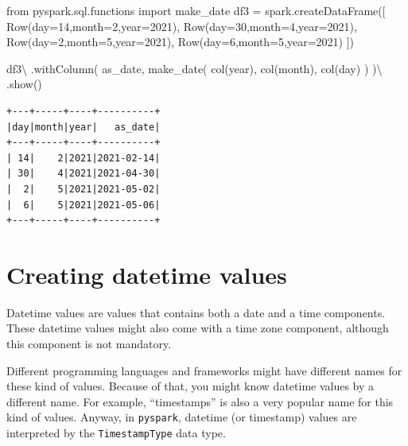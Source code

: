 \documentclass[
  11pt,
  letterpaper,
  DIV=11,
  numbers=noendperiod]{scrreprt}
\newenvironment{Shaded}{\begin{snugshade}}{\end{snugshade}}
\newcommand{\DecValTok}[1]{\textcolor[rgb]{0.68,0.00,0.00}{#1}}
\newcommand{\ImportTok}[1]{\textcolor[rgb]{0.00,0.46,0.62}{#1}}
\newcommand{\NormalTok}[1]{\textcolor[rgb]{0.00,0.23,0.31}{#1}}
\newcommand{\OperatorTok}[1]{\textcolor[rgb]{0.37,0.37,0.37}{#1}}
\newcommand{\StringTok}[1]{\textcolor[rgb]{0.13,0.47,0.30}{#1}}
\begin{document}
\begin{Shaded}
\begin{Highlighting}[]
\ImportTok{from}\NormalTok{ pyspark.sql.functions }\ImportTok{import}\NormalTok{ make\_date}
\NormalTok{df3 }\OperatorTok{=}\NormalTok{ spark.createDataFrame([}
\NormalTok{    Row(day}\OperatorTok{=}\DecValTok{14}\NormalTok{,month}\OperatorTok{=}\DecValTok{2}\NormalTok{,year}\OperatorTok{=}\DecValTok{2021}\NormalTok{),}
\NormalTok{    Row(day}\OperatorTok{=}\DecValTok{30}\NormalTok{,month}\OperatorTok{=}\DecValTok{4}\NormalTok{,year}\OperatorTok{=}\DecValTok{2021}\NormalTok{),}
\NormalTok{    Row(day}\OperatorTok{=}\DecValTok{2}\NormalTok{,month}\OperatorTok{=}\DecValTok{5}\NormalTok{,year}\OperatorTok{=}\DecValTok{2021}\NormalTok{),}
\NormalTok{    Row(day}\OperatorTok{=}\DecValTok{6}\NormalTok{,month}\OperatorTok{=}\DecValTok{5}\NormalTok{,year}\OperatorTok{=}\DecValTok{2021}\NormalTok{)}
\NormalTok{])}

\NormalTok{df3}\OperatorTok{\textbackslash{}}
\NormalTok{    .withColumn(}
        \StringTok{\textquotesingle{}as\_date\textquotesingle{}}\NormalTok{,}
\NormalTok{        make\_date(}
\NormalTok{            col(}\StringTok{\textquotesingle{}year\textquotesingle{}}\NormalTok{),}
\NormalTok{            col(}\StringTok{\textquotesingle{}month\textquotesingle{}}\NormalTok{),}
\NormalTok{            col(}\StringTok{\textquotesingle{}day\textquotesingle{}}\NormalTok{)}
\NormalTok{        )}
\NormalTok{    )}\OperatorTok{\textbackslash{}}
\NormalTok{    .show()}
\end{Highlighting}
\end{Shaded}

\begin{verbatim}
+---+-----+----+----------+
|day|month|year|   as_date|
+---+-----+----+----------+
| 14|    2|2021|2021-02-14|
| 30|    4|2021|2021-04-30|
|  2|    5|2021|2021-05-02|
|  6|    5|2021|2021-05-06|
+---+-----+----+----------+
\end{verbatim}

\section{Creating datetime values}\label{creating-datetime-values}

Datetime values are values that contains both a date and a time
components. These datetime values might also come with a time zone
component, although this component is not mandatory.

Different programming languages and frameworks might have different
names for these kind of values. Because of that, you might know datetime
values by a different name. For example, ``timestamps'' is also a very
popular name for this kind of values. Anyway, in \texttt{pyspark},
datetime (or timestamp) values are interpreted by the
\texttt{TimestampType} data type.
\end{document}
